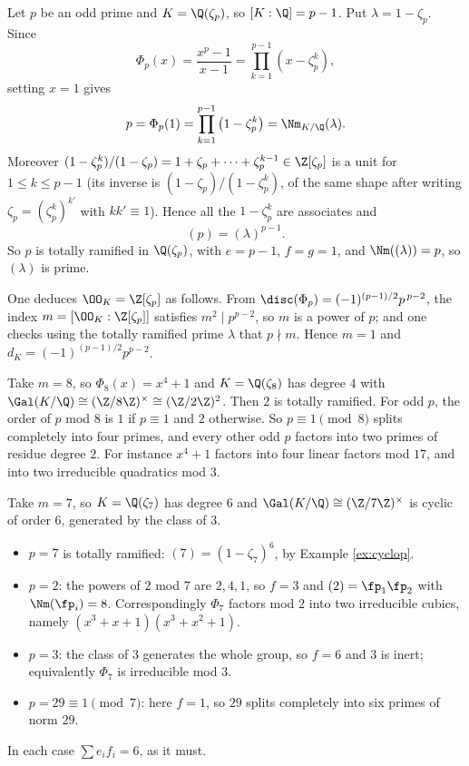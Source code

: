 \begin{example}\label{ex:cyclop}
	Let $p$ be an odd prime and $K = \Q(\zeta_p)$, so $[K:\Q] = p-1$. Put $\lambda = 1-\zeta_p$. Since
	$$\Phi_p(x) = \frac{x^p-1}{x-1} = \prod_{k=1}^{p-1}\left(x - \zeta_p^k\right),$$
	setting $x = 1$ gives
	$$p = \Phi_p(1) = \prod_{k=1}^{p-1}\left(1-\zeta_p^k\right) = \Nm_{K/\Q}(\lambda).$$
	Moreover $(1-\zeta_p^k)/(1-\zeta_p) = 1 + \zeta_p + \dots+\zeta_p^{k-1} \in \Z[\zeta_p]$ is a unit for $1 \leq k \leq p-1$ (its inverse is $(1-\zeta_p)/(1-\zeta_p^k)$, of the same shape after writing $\zeta_p = (\zeta_p^k)^{k'}$ with $kk'\equiv 1$). Hence all the $1 - \zeta_p^k$ are associates and
	$$(p) = (\lambda)^{p-1}.$$
	So $p$ is totally ramified in $\Q(\zeta_p)$, with $e = p-1$, $f = g = 1$, and $\Nm((\lambda)) = p$, so $(\lambda)$ is prime.

	One deduces $\OO_K = \Z[\zeta_p]$ as follows. From $\disc(\Phi_p) = (-1)^{(p-1)/2}p^{\,p-2}$, the index $m = [\OO_K:\Z[\zeta_p]]$ satisfies $m^2 \mid p^{p-2}$, so $m$ is a power of $p$; and one checks using the totally ramified prime $\lambda$ that $p \nmid m$. Hence $m=1$ and $d_K = (-1)^{(p-1)/2}p^{p-2}$.
\end{example}

\begin{example}
	Take $m = 8$, so $\Phi_8(x) = x^4+1$ and $K = \Q(\zeta_8)$ has degree $4$ with $\Gal(K/\Q) \cong (\Z/8\Z)^\times \cong (\Z/2\Z)^2$. Then $2$ is totally ramified. For odd $p$, the order of $p$ mod $8$ is $1$ if $p \equiv 1$ and $2$ otherwise. So $p \equiv 1\pmod 8$ splits completely into four primes, and every other odd $p$ factors into two primes of residue degree $2$. For instance $x^4+1$ factors into four linear factors mod $17$, and into two irreducible quadratics mod $3$.
\end{example}

\begin{example}
	Take $m = 7$, so $K = \Q(\zeta_7)$ has degree $6$ and $\Gal(K/\Q)\cong(\Z/7\Z)^\times$ is cyclic of order $6$, generated by the class of $3$.
	\begin{itemize}
		\item $p = 7$ is totally ramified: $(7) = (1-\zeta_7)^6$, by Example \ref{ex:cyclop}.
		\item $p=2$: the powers of $2$ mod $7$ are $2,4,1$, so $f = 3$ and $(2) = \fp_1\fp_2$ with $\Nm(\fp_i) = 8$. Correspondingly $\Phi_7$ factors mod $2$ into two irreducible cubics, namely $(x^3+x+1)(x^3+x^2+1)$.
		\item $p=3$: the class of $3$ generates the whole group, so $f = 6$ and $3$ is inert; equivalently $\Phi_7$ is irreducible mod $3$.
		\item $p = 29 \equiv 1 \pmod 7$: here $f=1$, so $29$ splits completely into six primes of norm $29$.
	\end{itemize}
	In each case $\sum e_if_i = 6$, as it must.
\end{example}

